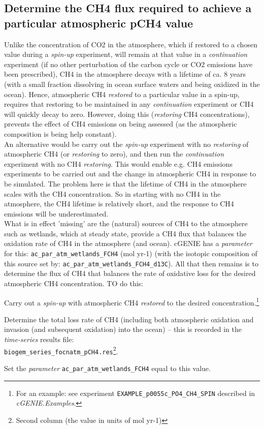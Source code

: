 \documentclass[10pt,twoside]{article}
\begin{document}

\subsection{Determine the CH4 flux required to achieve a particular atmospheric pCH4 value}

Unlike the concentration of CO2 in the atmosphere, which if restored to a chosen value during a \textit{spin-up} experiment, will remain at that value in a \textit{continuation} experiment (if no other perturbation of the carbon cycle or CO2 emissions have been prescribed), CH4 in the atmosphere decays with a lifetime of ca. 8 years (with a small fraction dissolving in ocean surface waters and being oxidized in the ocean). Hence, atmospheric CH4 \textit{restored} to a particular value in a spin-up, requires that restoring to be maintained in any \textit{continuation} experiment or CH4 will quickly decay to zero. However, doing this (\textit{restoring} CH4 concentrations), prevents the effect of CH4 emissions on being assessed (as the atmospheric composition is being help constant).\\
An alternative would be carry out the \textit{spin-up} experiment with no \textit{restoring} of atmospheric CH4 (or \textit{restoring} to zero), and then run the \textit{continuation} experiment with no CH4 \textit{restoring}. This would enable e.g. CH4 emissions experiments to be carried out and the change in atmospheric CH4 in response to be simulated. The problem here is that the lifetime of CH4 in the atmosphere scales with the CH4 concentration. So in starting with no CH4 in the atmosphere, the CH4 lifetime is relatively short, and the response to CH4 emissions will be underestimated.\\
What is in effect 'missing' are the (natural) sources of CH4 to the atmosphere such as wetlands, which at steady state, provide a CH4 flux that balances the oxidation rate of CH4 in the atmosphere (and ocean). cGENIE has a \textit{parameter} for this: \texttt{ac\_par\_atm\_wetlands\_FCH4} (mol yr-1) (with the isotopic composition of this source set by: \texttt{ac\_par\_atm\_wetlands\_FCH4\_d13C}). All that then remains is to determine the flux of CH4 that balances the rate of oxidative loss for the desired atmospheric CH4 concentration. TO do this:
\begin{compactenum}
	\item Carry out a \textit{spin-up} with atmospheric CH4 \textit{restored} to the desired concentration.\footnote{For an example: see experiment \texttt{EXAMPLE\_p0055c\_PO4\_CH4\_SPIN} described in \textit{cGENIE.Examples}.}
	\item Determine the total loss rate of CH4 (including both atmospheric oxidation and invasion (and subsequent oxidation) into the ocean) -- this is recorded in the \textit{time-series} results file:\\ \texttt{biogem\_series\_focnatm\_pCH4.res}\footnote{Second column (the value in units of mol yr-1)}.
	\item Set the \textit{parameter} \texttt{ac\_par\_atm\_wetlands\_FCH4} equal to this value.
\end{compactenum} 
\end{document}
